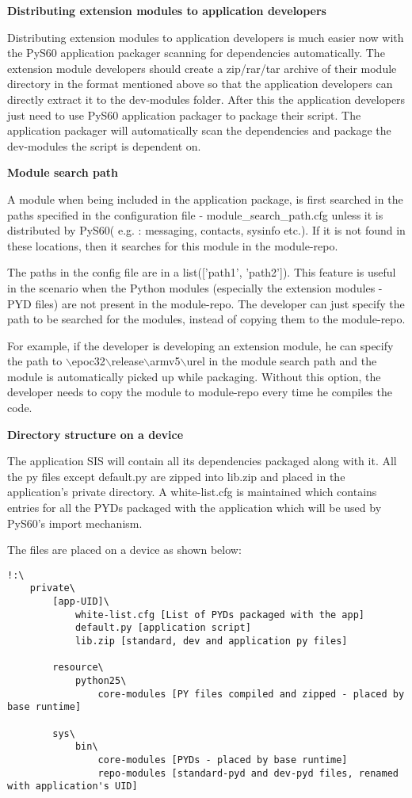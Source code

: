 {\bf Distributing extension modules to application developers} \break

Distributing extension modules to application developers is much easier now with
the PyS60 application packager scanning for dependencies automatically. The
extension module developers should create a zip/rar/tar archive of their module
directory in the format mentioned above so that the application developers can
directly extract it to the dev-modules folder. After this the application
developers just need to use PyS60 application packager to package their script.
The application packager will automatically scan the dependencies and package
the dev-modules the script is dependent on.


{\bf Module search path} \break

A module when being included in the application package, is first searched
in the paths specified in the configuration file - module_search_path.cfg unless
it is distributed by PyS60( e.g. : messaging, contacts, sysinfo etc.).
If it is not found in these locations, then it searches for this module in
the module-repo.

The paths in the config file are in a list(['path1', 'path2']). This feature is
useful in the scenario when the Python modules (especially the extension
modules - PYD files) are not present in the module-repo. The developer can
just specify the path to be searched for the modules, instead of copying them
to the module-repo.

For example, if the developer is developing an extension module, he can specify
the path to $\backslash$epoc32$\backslash$release$\backslash$armv5$\backslash$urel
in the module search path and the module is automatically picked up while packaging.
Without this option, the developer needs to copy the module to module-repo every
time he compiles the code.


{\bf Directory structure on a device} \break

The application SIS will contain all its dependencies packaged along with it. All
the py files except default.py are zipped into lib.zip and placed in the application's
private directory. A white-list.cfg is maintained which contains entries for
all the PYDs packaged with the application which will be used by PyS60's import
mechanism.

The files are placed on a device as shown below:
\begin{verbatim}
!:\
    private\
        [app-UID]\
            white-list.cfg [List of PYDs packaged with the app]
            default.py [application script]
            lib.zip [standard, dev and application py files]

        resource\
            python25\
                core-modules [PY files compiled and zipped - placed by base runtime]

        sys\
            bin\
                core-modules [PYDs - placed by base runtime]
                repo-modules [standard-pyd and dev-pyd files, renamed with application's UID]
\end{verbatim}



